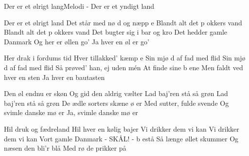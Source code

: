 \begin{sang}{Der er et ølrigt lang}{Melodi - Der er et yndigt land}
\begin{vers}
Der er et ølrigt land
Det står med nø d og næpp e
Blandt alt det p okkers vand
Blandt alt det p okkers vand
Det bugter sig i bar og kro
Det hedder gamle Danmark
Og her er øllen go'
Ja hver en øl er go'
\end{vers}
\begin{vers}
Her drak i fordums tid
Hver tillakked' kæmp e
Sin mjø d af fad med flid
Sin mjø d af fad med flid
Så prøved' han, ej uden mén
At finde sine b ene
Men faldt ved hver en sten
Ja hver en bautasten
\end{vers}
\vfill
\begin{vers}
Den øl endnu er skøn
Og gid den aldrig vælter
Lad baj'ren stå så grøn
Lad baj'ren stå så grøn
De ædle sorters skæne ø er
Med sutter, fulde svende
Og svimle danske mø er
Ja, svimle danske mø er
\end{vers}
\begin{vers}
Hil druk og fædreland
Hil hver en kølig bajer
Vi drikker dem vi kan
Vi drikker dem vi kan
Vort gamle Danmark - SKÅL! - b estå
Så længe øllet skummer
Og næsen den bli'r blå
Med rø de prikker på
\end{vers}
\laps
\end{sang}
